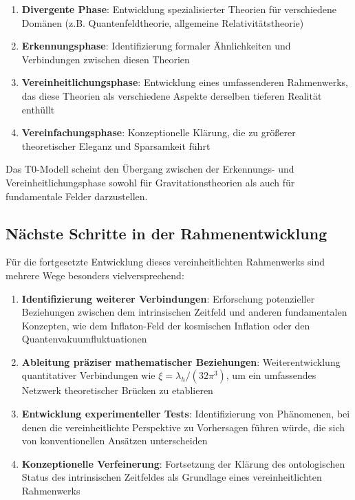 \documentclass[12pt,a4paper]{article}
\begin{document}
	\begin{enumerate}
		\item \textbf{Divergente Phase}: Entwicklung spezialisierter Theorien für verschiedene Domänen (z.B. Quantenfeldtheorie, allgemeine Relativitätstheorie)
		
		\item \textbf{Erkennungsphase}: Identifizierung formaler Ähnlichkeiten und Verbindungen zwischen diesen Theorien
		
		\item \textbf{Vereinheitlichungsphase}: Entwicklung eines umfassenderen Rahmenwerks, das diese Theorien als verschiedene Aspekte derselben tieferen Realität enthüllt
		
		\item \textbf{Vereinfachungsphase}: Konzeptionelle Klärung, die zu größerer theoretischer Eleganz und Sparsamkeit führt
	\end{enumerate}
	
	Das T0-Modell scheint den Übergang zwischen der Erkennungs- und Vereinheitlichungsphase sowohl für Gravitationstheorien als auch für fundamentale Felder darzustellen.
	
	\subsection{Nächste Schritte in der Rahmenentwicklung}
	\label{subsec:next_steps}
	
	Für die fortgesetzte Entwicklung dieses vereinheitlichten Rahmenwerks sind mehrere Wege besonders vielversprechend:
	
	\begin{enumerate}
		\item \textbf{Identifizierung weiterer Verbindungen}: Erforschung potenzieller Beziehungen zwischen dem intrinsischen Zeitfeld und anderen fundamentalen Konzepten, wie dem Inflaton-Feld der kosmischen Inflation oder den Quantenvakuumfluktuationen
		
		\item \textbf{Ableitung präziser mathematischer Beziehungen}: Weiterentwicklung quantitativer Verbindungen wie $\xi = \lambda_h/(32\pi^3)$, um ein umfassendes Netzwerk theoretischer Brücken zu etablieren
		
		\item \textbf{Entwicklung experimenteller Tests}: Identifizierung von Phänomenen, bei denen die vereinheitlichte Perspektive zu Vorhersagen führen würde, die sich von konventionellen Ansätzen unterscheiden
		
		\item \textbf{Konzeptionelle Verfeinerung}: Fortsetzung der Klärung des ontologischen Status des intrinsischen Zeitfeldes als Grundlage eines vereinheitlichten Rahmenwerks
	\end{enumerate}
	
\end{document}
